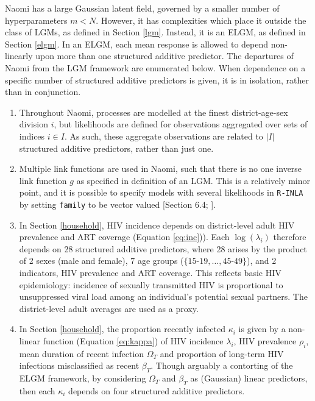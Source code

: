 \documentclass[a4paper, nobind]{templates/ociamthesis}
\begin{document}
Naomi has a large Gaussian latent field, governed by a smaller number of hyperparameters \(m < N\).
However, it has complexities which place it outside the class of LGMs, as defined in Section \ref{lgm}.
Instead, it is an ELGM, as defined in Section \ref{elgm}.
In an ELGM, each mean response is allowed to depend non-linearly upon more than one structured additive predictor.
The departures of Naomi from the LGM framework are enumerated below.
When dependence on a specific number of structured additive predictors is given, it is in isolation, rather than in conjunction.

\begin{enumerate}
\def\labelenumi{\arabic{enumi}.}
\item
  Throughout Naomi, processes are modelled at the finest district-age-sex division \(i\), but likelihoods are defined for observations aggregated over sets of indices \(i \in I\).
  As such, these aggregate observations are related to \(|I|\) structured additive predictors, rather than just one.
\item
  Multiple link functions are used in Naomi, such that there is no one inverse link function \(g\) as specified in definition of an LGM.
  This is a relatively minor point, and it is possible to specify models with several likelihoods in \texttt{R-INLA} by setting \texttt{family} to be vector valued {[}Section 6.4; \textcite{gomez2020bayesian}{]}.
\item
  In Section \ref{household}, HIV incidence depends on district-level adult HIV prevalence and ART coverage (Equation \eqref{eq:inc})).
  Each \(\log(\lambda_i)\) therefore depends on 28 structured additive predictors, where 28 arises by the product of 2 sexes (male and female), 7 age groups (\(\{\text{15-19}, \ldots, \text{45-49}\}\)), and 2 indicators, HIV prevalence and ART coverage.
  This reflects basic HIV epidemiology: incidence of sexually transmitted HIV is proportional to unsuppressed viral load among an individual's potential sexual partners.
  The district-level adult averages are used as a proxy.
\item
  In Section \ref{household}, the proportion recently infected \(\kappa_i\) is given by a non-linear function (Equation \eqref{eq:kappa}) of HIV incidence \(\lambda_i\), HIV prevalence \(\rho_i\), mean duration of recent infection \(\Omega_T\) and proportion of long-term HIV infections misclassified as recent \(\beta_T\).
  Though arguably a contorting of the ELGM framework, by considering \(\Omega_T\) and \(\beta_T\) as (Gaussian) linear predictors, then each \(\kappa_i\) depends on four structured additive predictors.

\end{enumerate}
\end{document}
